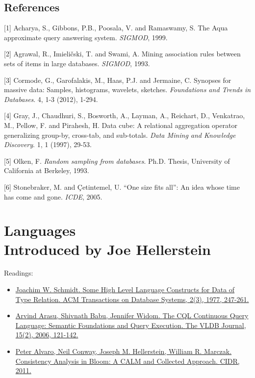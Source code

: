 \documentclass[b5paper,11pt,twoside,openright]{book}
\newcommand\Chapter[3]{
  \hypertarget{#1}{
    \chapter[#2]{#2\\{\Large #3}}\label{#1}
  }
}
\begin{document}
\section*{References}

\leavevmode\hypertarget{ref-aqua}{}%
{[}1{]} Acharya, S., Gibbons, P.B., Poosala, V. and Ramaswamy, S. The
Aqua approximate query answering system. \emph{SIGMOD}, 1999.

\leavevmode\hypertarget{ref-associationrules}{}%
{[}2{]} Agrawal, R., Imieličski, T. and Swami, A. Mining association
rules between sets of items in large databases. \emph{SIGMOD}, 1993.

\leavevmode\hypertarget{ref-fnt-sketch}{}%
{[}3{]} Cormode, G., Garofalakis, M., Haas, P.J. and Jermaine, C.
Synopses for massive data: Samples, histograms, wavelets, sketches.
\emph{Foundations and Trends in Databases}. 4, 1-3 (2012), 1-294.

\leavevmode\hypertarget{ref-gray-cube}{}%
{[}4{]} Gray, J., Chaudhuri, S., Bosworth, A., Layman, A., Reichart, D.,
Venkatrao, M., Pellow, F. and Pirahesh, H. Data cube: A relational
aggregation operator generalizing group-by, cross-tab, and sub-totals.
\emph{Data Mining and Knowledge Discovery}. 1, 1 (1997), 29-53.

\leavevmode\hypertarget{ref-olken-phd}{}%
{[}5{]} Olken, F. \emph{Random sampling from databases}. Ph.D. Thesis,
University of California at Berkeley, 1993.

\leavevmode\hypertarget{ref-onesize}{}%
{[}6{]} Stonebraker, M. and \c{C}etintemel, U. ``One size fits all'': An
idea whose time has come and gone. \emph{ICDE}, 2005.


\Chapter{ch9-languages}{%
Languages
}{%
Introduced by Joe Hellerstein
}

\begin{framed}
Readings:
\begin{itemize}
\item
\href{https://scholar.google.com/scholar?cluster=5934767222958591409}{Joachim
  W. Schmidt. {Some High Level Language Constructs for Data of Type
    Relation}. {ACM Transactions on Database Systems}, 2(3), 1977, 247-261.}
\item
\href{https://scholar.google.com/scholar?cluster=17215743948117955326}{Arvind
  Arasu, Shivnath Babu, Jennifer Widom. {The CQL Continuous Query
    Language: Semantic Foundations and Query Execution}. {The VLDB Journal},
  15(2), 2006, 121-142.}
\item
\href{https://scholar.google.com/scholar?cluster=9165311711752272482}{Peter
  Alvaro, Neil Conway, Joseph M. Hellerstein, William R. Marczak.
  {Consistency Analysis in Bloom: A CALM and Collected Approach}. {CIDR},
  2011.}
\end{itemize}
\end{framed}
\end{document}

